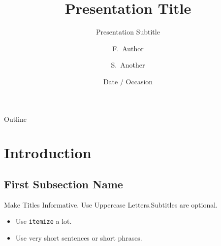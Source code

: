 \documentclass{beamer}
\title[Short Paper Title] %
{Presentation Title}
\subtitle
{Presentation Subtitle} %
\author[Author, Another] %
{F.~Author\inst{1} \and S.~Another\inst{2}}
\institute[Universities of Somewhere and Elsewhere] %
{
  \inst{1}%
  Department of Computer Science\\
  University of Somewhere
  \and
  \inst{2}%
  Department of Theoretical Philosophy\\
  University of Elsewhere}
\date[Short Occasion] %
{Date / Occasion}
\begin{document}
\begin{frame}
  \titlepage
\end{frame}

\begin{frame}{Outline}
  \tableofcontents
\end{frame}




\section{Introduction}

\subsection[Short First Subsection Name]{First Subsection Name}

\begin{frame}{Make Titles Informative. Use Uppercase Letters.}{Subtitles are optional.}

  \begin{itemize}
  \item
    Use \texttt{itemize} a lot.
  \item
    Use very short sentences or short phrases.
  \end{itemize}
\end{frame}
\end{document}
